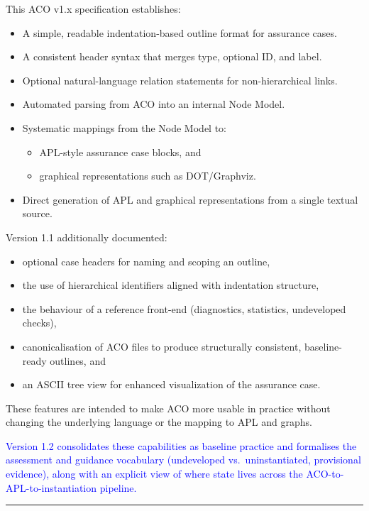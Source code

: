 \documentclass[11pt]{article}
\begin{document}
This ACO v1.x specification establishes:

\begin{itemize}[leftmargin=2em]
  \item A simple, readable indentation-based outline format for assurance cases.
  \item A consistent header syntax that merges type, optional ID, and label.
  \item Optional natural-language relation statements for non-hierarchical links.
  \item Automated parsing from ACO into an internal Node Model.
  \item Systematic mappings from the Node Model to:
  \begin{itemize}[leftmargin=1.5em]
    \item APL-style assurance case blocks, and
    \item graphical representations such as DOT/Graphviz.
  \end{itemize}
  \item Direct generation of APL and graphical representations from a single textual source.
\end{itemize}

Version 1.1 additionally documented:
\begin{itemize}[leftmargin=2em]
  \item optional case headers for naming and scoping an outline,
  \item the use of hierarchical identifiers aligned with indentation structure,
  \item the behaviour of a reference front-end (diagnostics, statistics, undeveloped checks),
  \item canonicalisation of ACO files to produce structurally consistent, baseline-ready outlines, and
  \item an ASCII tree view for enhanced visualization of the assurance case.
\end{itemize}
These features are intended to make ACO more usable in practice without changing the underlying language or the mapping to APL and graphs.

\textcolor{blue}{Version 1.2 consolidates these capabilities as baseline practice and formalises the assessment and guidance vocabulary (undeveloped vs.\ uninstantiated, provisional evidence), along with an explicit view of where state lives across the ACO-to-APL-to-instantiation pipeline.}

\bigskip
\hrule
\bigskip
\end{document}
